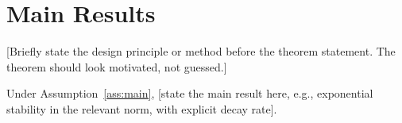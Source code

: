 \section{Main Results}\label{sec:results}

[Briefly state the design principle or method before the theorem statement.
The theorem should look motivated, not guessed.]

\begin{theorem}\label{thm:main}
Under Assumption~\ref{ass:main}, [state the main result here, e.g.,
exponential stability in the relevant norm, with explicit decay rate].
\end{theorem}

\begin{remark}
\end{remark}
